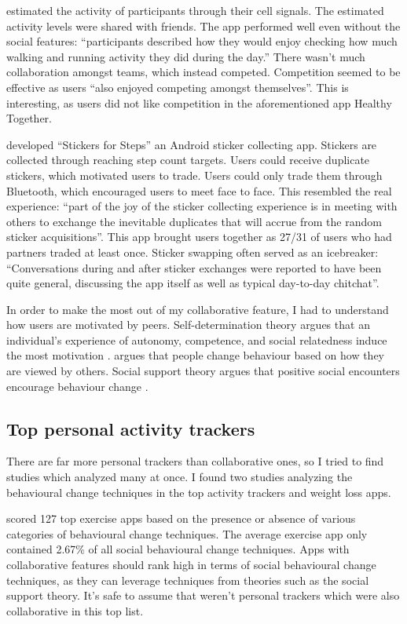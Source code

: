 \documentclass{l4proj}
\begin{document}
\citet{Shakra} estimated the activity of participants through their cell signals. The estimated activity levels were shared with friends. The app performed well even without the social features: ``participants described how they would enjoy checking how much walking and running activity they did during the day.'' There wasn't much collaboration amongst teams, which instead competed. Competition seemed to be effective as users ``also enjoyed competing amongst themselves''. This is interesting, as users did not like competition in the aforementioned app Healthy Together. 

\citet{Stickers} developed ``Stickers for Steps'' an Android sticker collecting app. Stickers are collected through reaching step count targets. Users could receive duplicate stickers, which motivated users to trade. Users could only trade them through Bluetooth, which encouraged users to meet face to face. This resembled the real experience: ``part of the joy of the sticker collecting experience is in meeting with others to exchange the inevitable duplicates that will accrue from the random sticker acquisitions''. This app brought users together as 27/31 of users who had partners traded at least once. Sticker swapping often served as an icebreaker: ``Conversations during and after sticker exchanges were reported to have been quite general, discussing the app itself as well as typical day-to-day chitchat''.

In order to make the most out of my collaborative feature, I had to understand how users are motivated by peers. Self-determination theory argues that an individual's experience of autonomy, competence, and social relatedness induce the most motivation \citep{self_determination_theory}. \citet{social_comparison_theory} argues that people change behaviour based on how they are viewed by others. Social support theory argues that positive social encounters encourage behaviour change \citep{social_support_theory}. 

\subsection{Top personal activity trackers}
 There are far more personal trackers than collaborative ones, so I tried to find studies which analyzed many at once. I found two studies analyzing the behavioural change techniques in the top activity trackers and weight loss apps.

\citet{AppsOfSteel} scored 127 top exercise apps based on the presence or absence of various categories of behavioural change techniques. The average exercise app only contained 2.67\% of all social behavioural change techniques. Apps with collaborative features should rank high in terms of social behavioural change techniques, as they can leverage techniques from theories such as the social support theory. It's safe to assume that weren't personal trackers which were also collaborative in this top list.
\end{document}
